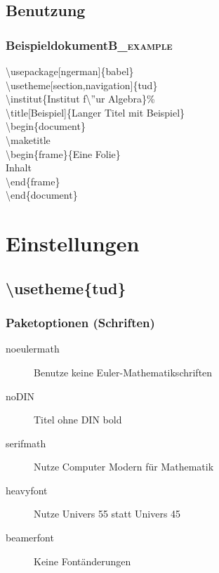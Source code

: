 \documentclass[presentation,t]{beamer}
\begin{document}
\subsection{Benutzung}
\label{sec:org1c92380}
\subsubsection[Beispieldokument]{Beispieldokument\hfill{}\textsc{B\_example}}
\label{sec:org6bab0cb}
\textbackslash usepackage[ngerman]\{babel\}\\
\textbackslash usetheme[section,navigation]\{tud\}\\
\textbackslash institut\{Institut f\textbackslash ''ur Algebra\}\%\\
\textbackslash title[Beispiel]\{Langer Titel mit Beispiel\}\\
\textbackslash begin\{document\}\\
\textbackslash maketitle\\
\textbackslash begin\{frame\}\{Eine Folie\}\\
Inhalt\\
\textbackslash end\{frame\}\\
\textbackslash end\{document\}\\

\section{Einstellungen}
\label{sec:org6e95185}
\subsection{\textbackslash usetheme\{tud\}}
\label{sec:org3e3cb0f}
\subsubsection{Paketoptionen (Schriften)}
\label{sec:org147f942}
\begin{description}
\item[{noeulermath}] Benutze keine Euler-Mathematikschriften
\item[{noDIN}] Titel ohne DIN bold
\item[{serifmath}] Nutze Computer Modern für Mathematik
\item[{heavyfont}] Nutze Univers 55 statt Univers 45
\item[{beamerfont}] Keine Fontänderungen
\end{description}
\end{document}
